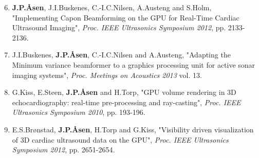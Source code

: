 \documentclass[10pt,b5paper,twoside]{book}
\begin{document}
\begin{enumerate}[VI]
\setcounter{enumi}{5}
\renewcommand\labelenumi{\bfseries\theenumi}

	\item \textbf{J.\:P.\:\AA{}sen}, J.\:I.\:Buskenes, C.-I.\:C.\:Nilsen, A.\:Austeng and S.\:Holm, "Implementing Capon Beamforming on the GPU for Real-Time Cardiac Ultrasound Imaging", {\it Proc. IEEE Ultrasonics Symposium 2012}, pp. 2133-2136.

	\item J.\:I.\:Buskenes, \textbf{J.\:P.\:\AA{}sen}, C.-I.\:C.\:Nilsen and A.\:Austeng, "Adapting the Minimum variance beamformer to a graphics processing unit for active sonar imaging systems", {\it Proc. Meetings on Acoustics 2013} vol. 13.
	
	\item G.\:Kiss, E.\:Steen, \textbf{J.\:P.\:\AA{}sen} and H.\:Torp, "GPU volume rendering in 3D echocardiography: real-time pre-processing and ray-casting", {\it Proc. IEEE Ultrasonics Symposium 2010}, pp. 193-196.


	\item E.\:S.\:Br\o{}nstad, \textbf{J.\:P.\:\AA{}sen}, H.\:Torp and G.\:Kiss, "Visibility driven visualization of 3D cardiac ultrasound data on the GPU", {\it Proc. IEEE Ultrasonics Symposium 2012}, pp. 2651-2654.
\end{enumerate}

\newpage\thispagestyle{empty}
\pagestyle{fancy}

%

\cleardoublepage
{}
\renewcommand*\contentsname{Contents}
\tableofcontents

\cleardoublepage
{}
\printnomenclature

\cleardoublepage
\setcounter{page}{1}
\renewcommand{\thepage}{\arabic{page}}


\begin{bibunit}[ieeetr]

\newpage{}
\end{bibunit}
\end{document}
